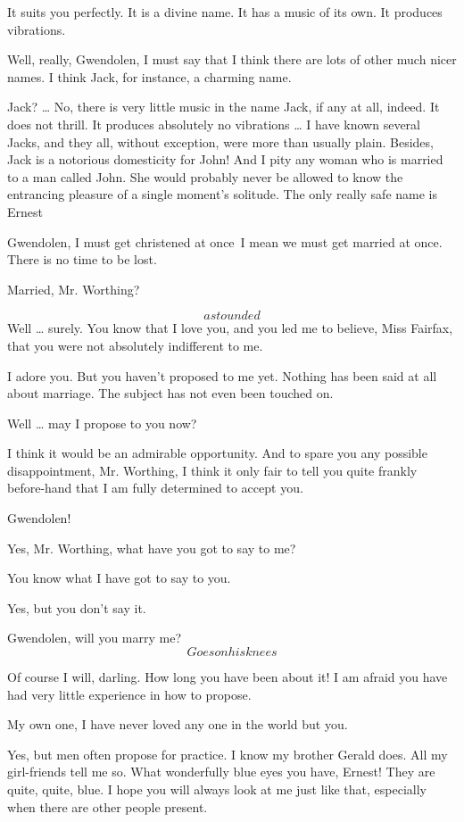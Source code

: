 \documentclass{book}
\begin{document}
\4  It suits you perfectly.  It is a divine name.  It has a
music of its own.  It produces vibrations.

\1  Well, really, Gwendolen, I must say that I think there are
lots of other much nicer names.  I think Jack, for instance, a
charming name.

\4  Jack? \ldots{} No, there is very little music in the name
Jack, if any at all, indeed.  It does not thrill.  It produces
absolutely no vibrations \ldots{} I have known several Jacks, and they
all, without exception, were more than usually plain.  Besides,
Jack is a notorious domesticity for John!  And I pity any woman who
is married to a man called John.  She would probably never be
allowed to know the entrancing pleasure of a single moment's
solitude.  The only really safe name is Ernest

\1  Gwendolen, I must get christened at once \textendash\,\textendash I mean we must
get married at once.  There is no time to be lost.

\4  Married, Mr. Worthing?

\1  \[astounded\]  Well \ldots{} surely.  You know that I love you,
and you led me to believe, Miss Fairfax, that you were not
absolutely indifferent to me.

\4  I adore you.  But you haven't proposed to me yet.
Nothing has been said at all about marriage.  The subject has not
even been touched on.

\1  Well \ldots{} may I propose to you now?

\4  I think it would be an admirable opportunity.  And to
spare you any possible disappointment, Mr. Worthing, I think it
only fair to tell you quite frankly before-hand that I am fully
determined to accept you.

\1  Gwendolen!

\4  Yes, Mr. Worthing, what have you got to say to me?

\1  You know what I have got to say to you.

\4  Yes, but you don't say it.

\1  Gwendolen, will you marry me?  \[Goes on his knees\]

\4  Of course I will, darling.  How long you have been
about it!  I am afraid you have had very little experience in how
to propose.

\1  My own one, I have never loved any one in the world but you.

\4  Yes, but men often propose for practice.  I know my
brother Gerald does.  All my girl-friends tell me so.  What
wonderfully blue eyes you have, Ernest!  They are quite, quite,
blue.  I hope you will always look at me just like that, especially
when there are other people present.
\end{document}
